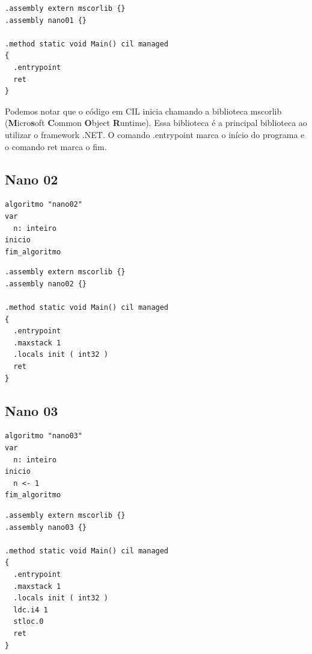 \documentclass[hidelinks,12pt]{article}
\begin{document}
\begin{lstlisting}[caption=Módulo mínimo que caracteriza um programa (CIL)]	
.assembly extern mscorlib {}
.assembly nano01 {}

.method static void Main() cil managed
{
  .entrypoint
  ret
}
\end{lstlisting}
	
	
	
	Podemos notar que o código em CIL inicia chamando a biblioteca mscorlib ({\bf M}icro{\bf s}oft {\bf C}ommon {\bf O}bject {\bf R}untime). Essa biblioteca é a principal biblioteca ao utilizar o framework .NET.
	O comando .entrypoint marca o início do programa e o comando ret marca o fim.
	
	
	
\subsection{Nano 02}
	
	\begin{lstlisting}[caption=Declaração de uma variável (Portugol)]
algoritmo "nano02"
var
  n: inteiro
inicio
fim_algoritmo
	\end{lstlisting}

\begin{lstlisting}[caption=Declaração de uma variável (CIL)]	
.assembly extern mscorlib {}
.assembly nano02 {}

.method static void Main() cil managed
{
  .entrypoint
  .maxstack 1
  .locals init ( int32 )
  ret
}
\end{lstlisting}

\subsection{Nano 03}

	\begin{lstlisting}[caption=Atribuição de um inteiro a uma variável (Portugol)]
algoritmo "nano03"
var
  n: inteiro
inicio
  n <- 1
fim_algoritmo
	\end{lstlisting}
	
	\begin{lstlisting}[caption=Atribuição de um inteiro a uma variável (CIL)]
.assembly extern mscorlib {}
.assembly nano03 {}

.method static void Main() cil managed
{
  .entrypoint
  .maxstack 1
  .locals init ( int32 )
  ldc.i4 1 
  stloc.0
  ret
}
	\end{lstlisting}
\end{document}
